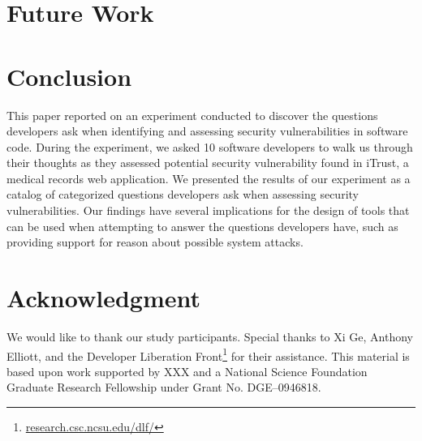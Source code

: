 \documentclass[conference]{IEEEtran}
\begin{document}
\section{Future Work}
\label{sec:fw}

\section{Conclusion}
\label{sec:concl}
This paper reported on an experiment conducted to discover the questions developers ask when identifying and assessing security vulnerabilities in software code.
During the experiment, we asked 10 software developers to walk us through their thoughts as they assessed potential security vulnerability found in iTrust, a medical records web application.
We presented the results of our experiment as a catalog of categorized questions developers ask when assessing security vulnerabilities.
Our findings have several implications for the design of tools that can be used when attempting to answer the questions developers have, such as providing support for reason about possible system attacks.






\section*{Acknowledgment}

We would like to thank our study participants. 
Special thanks to Xi Ge, Anthony Elliott, and the Developer Liberation Front\footnote{\url{research.csc.ncsu.edu/dlf/}} for their assistance. 
This material is based upon work supported by XXX and a National Science Foundation Graduate Research Fellowship under Grant No. DGE--0946818.



%




\end{document}
